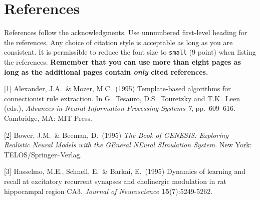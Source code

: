\documentclass{article}
\begin{document}
\section*{References}

References follow the acknowledgments. Use unnumbered first-level
heading for the references. Any choice of citation style is acceptable
as long as you are consistent. It is permissible to reduce the font
size to \verb+small+ (9 point) when listing the references. {\bf
  Remember that you can use more than eight pages as long as the
  additional pages contain \emph{only} cited references.}
\medskip

\small

[1] Alexander, J.A.\ \& Mozer, M.C.\ (1995) Template-based algorithms
for connectionist rule extraction. In G.\ Tesauro, D.S.\ Touretzky and
T.K.\ Leen (eds.), {\it Advances in Neural Information Processing
  Systems 7}, pp.\ 609--616. Cambridge, MA: MIT Press.

[2] Bower, J.M.\ \& Beeman, D.\ (1995) {\it The Book of GENESIS:
  Exploring Realistic Neural Models with the GEneral NEural SImulation
  System.}  New York: TELOS/Springer--Verlag.

[3] Hasselmo, M.E., Schnell, E.\ \& Barkai, E.\ (1995) Dynamics of
learning and recall at excitatory recurrent synapses and cholinergic
modulation in rat hippocampal region CA3. {\it Journal of
  Neuroscience} {\bf 15}(7):5249-5262.
\end{document}
